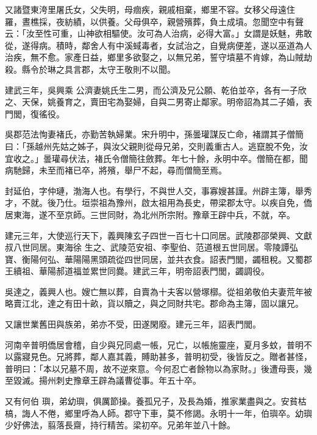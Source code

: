 \begin{pinyinscope}
 又諸暨東洿里屠氏女，父失明，母痼疾，親戚相棄，鄉里不容。女移父母遠住羅，晝樵採，夜紡績，以供養。父母俱卒，親營殯葬，負土成墳。忽聞空中有聲云：「汝至性可重，山神欲相驅使。汝可為人治病，必得大富。」女謂是妖魅，弗敢從，遂得病。積時，鄰舍人有中溪蜮毒者，女試治之，自覺病便差，遂以巫道為人治疾，無不愈。家產日益，鄉里多欲娶之，以無兄弟，誓守墳墓不肯嫁，為山賊劫殺。縣令於琳之具言郡，太守王敬則不以聞。



 建武三年，吳興乘
 公濟妻姚氏生二男，而公濟及兄公願、乾伯並卒，各有一子欣之、天保，姚養育之，賣田宅為娶婦，自與二男寄止鄰家。明帝詔為其二子婚，表門閭，復徭役。



 吳郡范法恂妻褚氏，亦勤苦執婦業。宋升明中，孫曇瓘謀反亡命，褚謂其子僧簡曰：「孫越州先姑之姊子，與汝父親則從母兄弟，交則義重古人。逃竄脫不免，汝宜收之。」曇瓘尋伏法，褚氏令僧簡往斂葬。年七十餘，永明中卒。僧簡在都，聞病馳歸，未至而褚已卒，將殯，舉尸不起，尋而僧簡至焉。



 封延伯，字仲璉，渤海人也。有學行，不與世人交，事寡嫂甚謹。州辟主簿，舉秀才，不就。後乃仕。垣崇祖為豫州，啟太祖用為長史，帶梁郡太守。以疾自免，僑居東海，遂不至京師。三世同財，為北州所宗附。豫章王辟中兵，不就，卒。



 建元三年，大使巡行天下，義興陳玄子四世一百七十口同居。武陵郡邵榮興、文獻叔八世同居。東海徐
 生之、武陵范安祖、李聖伯、范道根五世同居。零陵譚弘寶、衡陽何弘、華陽陽黑頭疏從四世同居，並共衣食。詔表門閭，蠲租稅。又蜀郡王續祖、華陽郝道福並累世同爨。建武三年，明帝詔表門閭，蠲調役。



 吳達之，義興人也。嫂亡無以葬，自賣為十夫客以營塚槨。從祖弟敬伯夫妻荒年被略賣江北，達之有田十畝，貨以贖之，與之同財共宅。郡命為主簿，固以讓兄。



 又讓世業舊田與族弟，弟亦不受，田遂閑廢。建元三年，詔表門閭。



 河南辛普明僑居會稽，自少與兄同處一帳，兄亡，以帳施靈座，夏月多蚊，普明不以露寢見色。兄將葬，鄰人嘉其義，賻助甚多，普明初受，後皆反之。贈者甚怪，普明曰：「本以兄墓不周，故不逆來意。今何忍亡者餘物以為家財。」後遭母喪，幾至毀滅。揚州刺史豫章王辟為議曹從事。年五十卒。



 又有何伯
 璵，弟幼璵，俱厲節操。養孤兄子，及長為婚，推家業盡與之。安貧枯槁，誨人不倦，鄉里呼為人師。郡守下車，莫不修謁。永明十一年，伯璵卒。幼璵少好佛法，翦落長齋，持行精苦。梁初卒。兄弟年並八十餘。




\end{pinyinscope}
